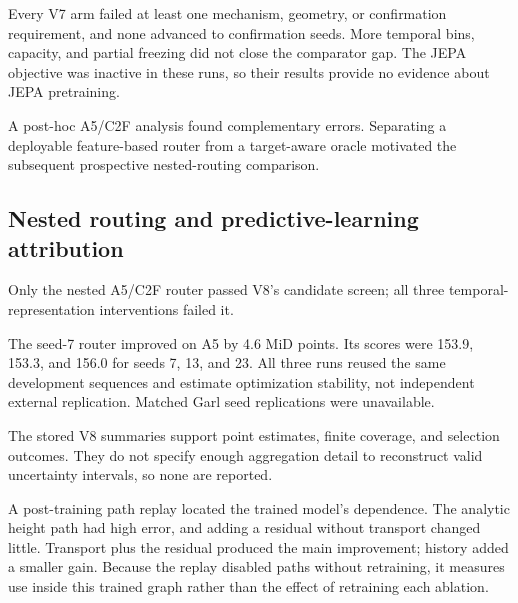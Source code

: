 Every V7 arm failed at least one mechanism, geometry, or confirmation requirement, and none advanced to confirmation seeds. More temporal bins, capacity, and partial freezing did not close the comparator gap. The JEPA objective was inactive in these runs, so their results provide no evidence about JEPA pretraining.

A post-hoc A5/C2F analysis found complementary errors. Separating a deployable feature-based router from a target-aware oracle motivated the subsequent prospective nested-routing comparison. 

\subsection{Nested routing and predictive-learning attribution}

Only the nested A5/C2F router passed V8's candidate screen; all three temporal-representation interventions failed it. 

\begin{table}[htbp]
\centering\small

\caption{V8 seed-7 MiD and finite coverage for the router and temporal-representation arms.}
\label{tab:early-v8}
\end{table}

The seed-7 router improved on A5 by 4.6 MiD points. Its scores were 153.9, 153.3, and 156.0 for seeds 7, 13, and 23. All three runs reused the same development sequences and estimate optimization stability, not independent external replication. Matched Garl seed replications were unavailable.

The stored V8 summaries support point estimates, finite coverage, and selection outcomes. They do not specify enough aggregation detail to reconstruct valid uncertainty intervals, so none are reported.

A post-training path replay located the trained model's dependence. The analytic height path had high error, and adding a residual without transport changed little. Transport plus the residual produced the main improvement; history added a smaller gain. Because the replay disabled paths without retraining, it measures use inside this trained graph rather than the effect of retraining each ablation. 

\begin{table}[htbp]
\centering\small

\caption{V8 post-training path replay showing MiD for the analytic, residual, transport, and history paths.}
\label{tab:early-factorial}
\end{table}


